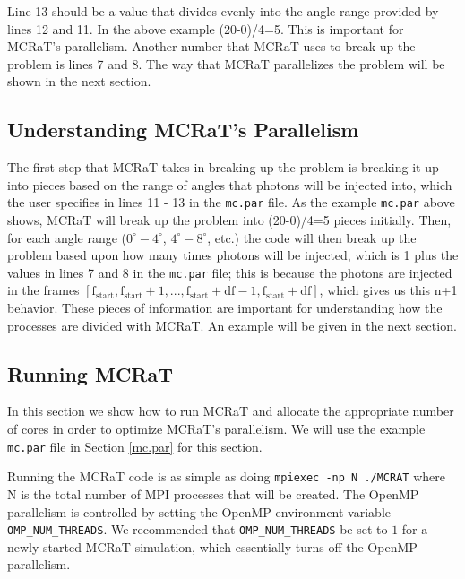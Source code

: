 \documentclass[12pt,a4paper]{article}
\begin{document}
Line 13 should be a value that divides evenly into the angle range provided by lines 12 and 11. In the above example (20-0)/4=5. This is important for MCRaT's parallelism. Another number that MCRaT uses to break up the problem is lines 7 and 8. The way that MCRaT parallelizes the problem will be shown in the next section.

\subsection{Understanding MCRaT's Parallelism}
The first step that MCRaT takes in breaking up the problem is breaking it up into pieces based on the range of angles that photons will be injected into, which the user specifies in lines 11 - 13 in the \texttt{mc.par} file. As the example \texttt{mc.par} above shows, MCRaT will break up the problem into (20-0)/4=5 pieces initially. Then, for each angle range ($0^\circ-4^\circ$, $4^\circ-8^\circ$, etc.) the code will then break up the problem based upon how many times photons will be injected, which is 1 plus the values in lines 7 and 8 in the \texttt{mc.par} file; this is because the photons are injected in the frames $[\mathrm{f_{start}}, \mathrm{f_{start}}+1, ..., \mathrm{f_{start}}+\mathrm{df}-1, \mathrm{f_{start}}+\mathrm{df}]$, which gives us this n+1 behavior. These pieces of information are important for understanding how the processes are divided with MCRaT. An example will be given in the next section.

\subsection{Running MCRaT}
In this section we show how to run MCRaT and allocate the appropriate number of cores in order to optimize MCRaT's parallelism. We will use the example \texttt{mc.par} file in Section \ref{mc.par} for this section. 

Running the MCRaT code is as simple as doing \texttt{mpiexec -np N ./MCRAT} where N is the total number of MPI processes that will be created. The OpenMP parallelism is controlled by setting the OpenMP environment variable \texttt{OMP\_NUM\_THREADS}. We recommended that \texttt{OMP\_NUM\_THREADS} be set to $1$ for a newly started MCRaT simulation, which essentially turns off the OpenMP parallelism. 
\end{document}
